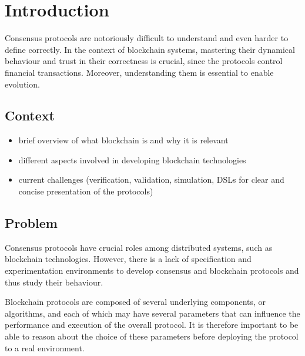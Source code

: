 

\chapter{Introduction}
\label{cha:introduction}

Consensus protocols are notoriously difficult to understand and even harder to define correctly. In the context of blockchain systems, mastering their dynamical behaviour and trust in their correctness is crucial, since the protocols control financial transactions. Moreover, understanding them is essential to enable evolution.

\section{Context}


\begin{itemize}
  \item brief overview of what blockchain is and why it is relevant
  \item different aspects involved in developing blockchain technologies
  \item current challenges (verification, validation, simulation, DSLs for clear and concise presentation of the protocols)
\end{itemize}



\section{Problem}

Consensus protocols have crucial roles among distributed systems, such as blockchain technologies. However, there is a lack of specification and experimentation environments to develop consensus and blockchain protocols and thus study their behaviour.

Blockchain protocols are composed of several underlying components, or algorithms, and each of which may have several parameters that can influence the performance and execution of the overall protocol. It is therefore important to be able to reason about the choice of these parameters before deploying the protocol to a real environment.

